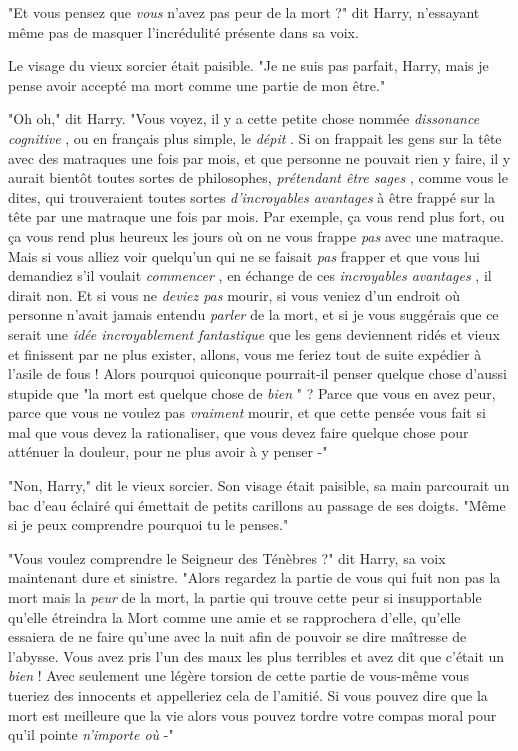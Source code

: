"Et vous pensez que \emph{vous}  n'avez pas peur de la mort ?" dit Harry, n'essayant même pas de masquer l'incrédulité présente dans sa voix.

Le visage du vieux sorcier était paisible. "Je ne suis pas parfait, Harry, mais je pense avoir accepté ma mort comme une partie de mon être."

"Oh oh," dit Harry. "Vous voyez, il y a cette petite chose nommée \emph{dissonance cognitive} , ou en français plus simple, le \emph{dépit} . Si on frappait les gens sur la tête avec des matraques une fois par mois, et que personne ne pouvait rien y faire, il y aurait bientôt toutes sortes de philosophes, \emph{prétendant être sages} , comme vous le dites, qui trouveraient toutes sortes \emph{d'incroyables avantages}  à être frappé sur la tête par une matraque une fois par mois. Par exemple, ça vous rend plus fort, ou ça vous rend plus heureux les jours où on ne vous frappe \emph{pas}  avec une matraque. Mais si vous alliez voir quelqu'un qui ne se faisait \emph{pas}  frapper et que vous lui demandiez s'il voulait \emph{commencer} , en échange de ces \emph{incroyables avantages} , il dirait non. Et si vous ne \emph{deviez pas}  mourir, si vous veniez d'un endroit où personne n'avait jamais entendu \emph{parler}  de la mort, et si je vous suggérais que ce serait une \emph{idée incroyablement fantastique } que les gens deviennent ridés et vieux et finissent par ne plus exister, allons, vous me feriez tout de suite expédier à l'asile de fous ! Alors pourquoi quiconque pourrait-il penser quelque chose d'aussi stupide que "la mort est quelque chose de \emph{bien} " ? Parce que vous en avez peur, parce que vous ne voulez pas \emph{vraiment}  mourir, et que cette pensée vous fait si mal que vous devez la rationaliser, que vous devez faire quelque chose pour atténuer la douleur, pour ne plus avoir à y penser -"

"Non, Harry," dit le vieux sorcier. Son visage était paisible, sa main parcourait un bac d'eau éclairé qui émettait de petits carillons au passage de ses doigts. "Même si je peux comprendre pourquoi tu le penses."

"Vous voulez comprendre le Seigneur des Ténèbres ?" dit Harry, sa voix maintenant dure et sinistre. "Alors regardez la partie de vous qui fuit non pas la mort mais la \emph{peur}  de la mort, la partie qui trouve cette peur si insupportable qu'elle étreindra la Mort comme une amie et se rapprochera d'elle, qu'elle essaiera de ne faire qu'une avec la nuit afin de pouvoir se dire maîtresse de l'abysse. Vous avez pris l'un des maux les plus terribles et avez dit que c'était un \emph{bien}  ! Avec seulement une légère torsion de cette partie de vous-même vous tueriez des innocents et appelleriez cela de l'amitié. Si vous pouvez dire que la mort est meilleure que la vie alors vous pouvez tordre votre compas moral pour qu'il pointe \emph{n'importe où}  -"

